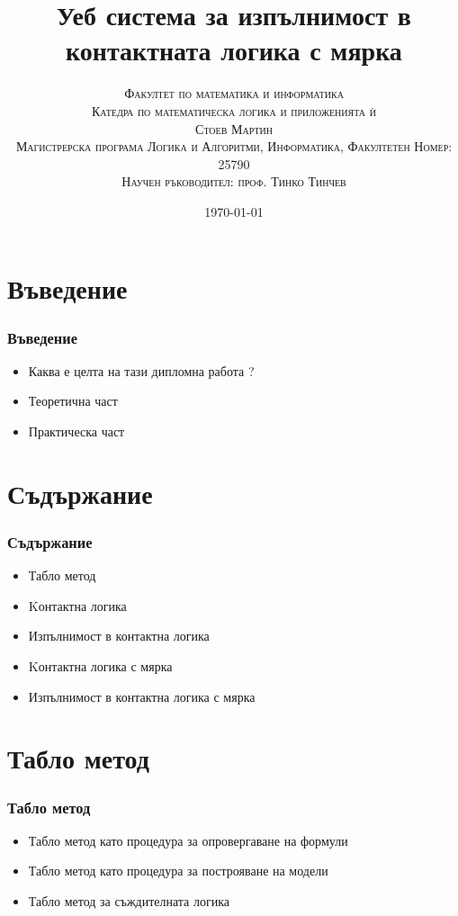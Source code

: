 \documentclass{beamer}
\begin{document}
\title{Уеб система за изпълнимост в контактната логика с мярка}  
\author{\textsc{Факултет по математика и информатика} \\
	\textsc{Катедра по математическа логика и приложенията ѝ} \\ [3mm]
	\textsc{Стоев Мартин} \\ [3mm]
	\textsc{Магистрерска програма Логика и Алгоритми, Информатика, Факултетен Номер: 25790} \\ [4mm]
	\small\textsc{Научен ръководител: проф. Тинко Тинчев}}
\date{\today} 
\begin{frame}
\titlepage
\end{frame}



\section{Въведение} 
\begin{frame}\frametitle{Въведение}
\begin{itemize}
	\item Каква е целта на тази дипломна работа ?
	\item Теоретична част
	\item Практическа част
\end{itemize}
\end{frame}

\section{Съдържание} 
\begin{frame}\frametitle{Съдържание}
\begin{itemize}
	\item Табло метод
	\item Kонтактна логика
	\item Изпълнимост в контактна логика
	\item Kонтактна логика с мярка
	\item Изпълнимост в контактна логика с мярка
\end{itemize}
\end{frame}

\section{Табло метод}
\begin{frame}\frametitle{Табло метод}
\begin{itemize}
	\item Табло метод като процедура за опровергаване на формули
	\item Табло метод като процедура за построяване на модели
	\item Табло метод за съждителната логика
\end{itemize}
\end{frame}
\end{document}

